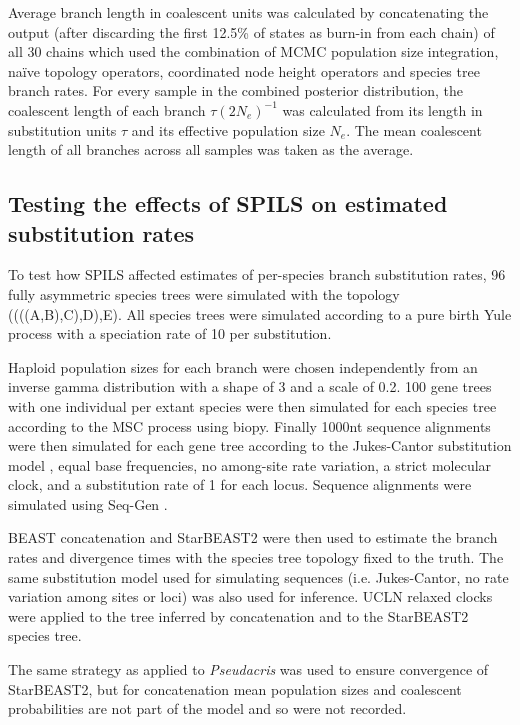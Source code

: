 \documentclass[12pt]{article}
\begin{document}
Average branch length in coalescent units was calculated by concatenating the
output (after discarding the first 12.5\% of states as burn-in from each
chain) of all 30 chains which used the combination of MCMC population size
integration, na\"ive topology operators, coordinated node height operators and
species tree branch rates. For every sample in the combined posterior
distribution, the coalescent length of each branch $\tau(2N_e)^{-1}$ was
calculated from its length in substitution units $\tau$ and its effective
population size $N_e$. The mean coalescent length of all branches across all
samples was taken as the average.

\subsection{Testing the effects of SPILS on estimated substitution rates}

To test how SPILS affected estimates of per-species branch substitution rates,
96 fully asymmetric species trees were simulated with the topology
((((A,B),C),D),E). All species trees were simulated according to a pure birth Yule
process \citep{Yule21} with a speciation rate of 10 per substitution.

Haploid population sizes for each branch were chosen independently from an
inverse gamma distribution with a shape of 3 and a scale of 0.2. 100 gene trees
with one individual per extant species were then simulated for each species tree
according to the MSC process using biopy. Finally 1000nt sequence alignments
were then simulated for each gene tree according to the Jukes-Cantor
substitution model \citep{JUKES196921}, equal base frequencies, no among-site
rate variation, a strict molecular clock, and a substitution rate of 1 for each
locus. Sequence alignments were simulated using Seq-Gen \citep{Rambaut01061997}.

BEAST concatenation and StarBEAST2 were then used to estimate the branch rates
and divergence times with the species tree topology fixed to the truth. The same
substitution model used for simulating sequences (i.e. Jukes-Cantor, no rate
variation among sites or loci) was also used for inference. UCLN relaxed
clocks were applied to the tree inferred by concatenation and to the
StarBEAST2 species tree.

The same strategy as applied to \textit{Pseudacris} was used to ensure
convergence of StarBEAST2, but for concatenation mean population sizes and coalescent
probabilities are not part of the model and so were not recorded.
\end{document}
